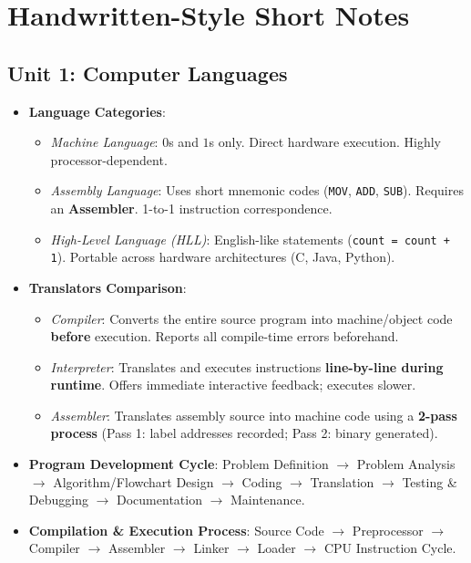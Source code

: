 \chapter*{Handwritten-Style Short Notes}
\label{chap:short_notes}

\section*{Unit 1: Computer Languages}
\begin{itemize}[leftmargin=6mm]
    \item \textbf{Language Categories}:
    \begin{itemize}
        \item \textit{Machine Language}: $0$s and $1$s only. Direct hardware execution. Highly processor-dependent.
        \item \textit{Assembly Language}: Uses short mnemonic codes (\texttt{MOV}, \texttt{ADD}, \texttt{SUB}). Requires an \textbf{Assembler}. 1-to-1 instruction correspondence.
        \item \textit{High-Level Language (HLL)}: English-like statements (\texttt{count = count + 1}). Portable across hardware architectures (C, Java, Python).
    \end{itemize}
    \item \textbf{Translators Comparison}:
    \begin{itemize}
        \item \textit{Compiler}: Converts the entire source program into machine/object code \textbf{before} execution. Reports all compile-time errors beforehand.
        \item \textit{Interpreter}: Translates and executes instructions \textbf{line-by-line during runtime}. Offers immediate interactive feedback; executes slower.
        \item \textit{Assembler}: Translates assembly source into machine code using a \textbf{2-pass process} (Pass 1: label addresses recorded; Pass 2: binary generated).
    \end{itemize}
    \item \textbf{Program Development Cycle}: Problem Definition $\rightarrow$ Problem Analysis $\rightarrow$ Algorithm/Flowchart Design $\rightarrow$ Coding $\rightarrow$ Translation $\rightarrow$ Testing \& Debugging $\rightarrow$ Documentation $\rightarrow$ Maintenance.
    \item \textbf{Compilation \& Execution Process}: Source Code $\rightarrow$ Preprocessor $\rightarrow$ Compiler $\rightarrow$ Assembler $\rightarrow$ Linker $\rightarrow$ Loader $\rightarrow$ CPU Instruction Cycle.
\end{itemize}

